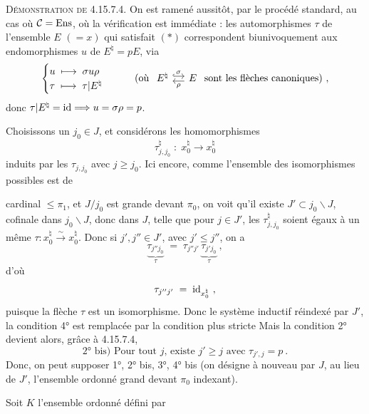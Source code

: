 \textsc{Démonstration de} 4.15.7.4. On est ramené aussitôt, par le procédé standard, au cas où $\mathcal{C} = \mathrm{Ens}$, où la vérification est immédiate : les automorphismes $\tau$ de l'ensemble $E$ $(= x)$ qui satisfait $(*)$ correspondent biunivoquement aux endomorphismes $u$ de $E^\natural = pE$, via
\[
\begin{cases}
u \;\longmapsto\; \sigma u \rho \\
\tau \;\longmapsto\; \tau|E^\natural
\end{cases}
\qquad
\text{(où }
\begin{tikzcd}[column sep=small]
E^\natural \arrow[r, hook, shift left, "\sigma"] & E \arrow[l, shift left, "\rho"]
\end{tikzcd}
\text{ sont les flèches canoniques)}\ ,
\]
donc $\tau|E^\natural = \mathrm{id} \Longrightarrow u = \sigma\rho = p$.

Choisissons un $j_0 \in J$, et considérons les homomorphismes
\[
\tau^\natural_{j,j_0} \;:\; x_0^\natural \longrightarrow x_0^\natural
\]
induits par les $\tau_{j,j_0}$ avec $j \geqslant j_0$. Ici encore, comme l'ensemble des isomorphismes possibles est de

cardinal $\leqslant \pi_1$, et $J/j_0$ est grande devant $\pi_0$, on voit qu'il existe $J' \subset j_0\backslash J$, cofinale dans $j_0\backslash J$, donc dans $J$, telle que pour $j \in J'$, les $\tau^\natural_{j,j_0}$ soient égaux à un même $\tau : x_0^\natural \xrightarrow{\sim} x_0^\natural$. Donc si $j', j'' \in J'$, avec $j' \leqslant j''$, on a
\[
\underbrace{\tau_{j''j_0}}_{\tau} \;=\; \tau_{j''j'}\,\underbrace{\tau_{j'j_0}}_{\tau}\ ,
\]
d'où
\[
\tau_{j''j'} \;=\; \id_{x_0^\natural}\ ,
\]
puisque la flèche $\tau$ est un isomorphisme. Donc le système inductif réindexé par $J'$, la condition 4° est remplacée par la condition plus stricte  Mais la condition 2° devient alors, grâce à 4.15.7.4,
\[
\boxed{\text{2° bis) Pour tout } j\text{, existe } j' \geqslant j \text{ avec } \tau_{j',j} = p}\ .
\]
Donc, on peut supposer 1°, 2° bis, 3°, 4° bis (on désigne à nouveau par $J$, au lieu de $J'$, l'ensemble ordonné grand devant $\pi_0$ indexant).

Soit $K$ l'ensemble ordonné défini par

